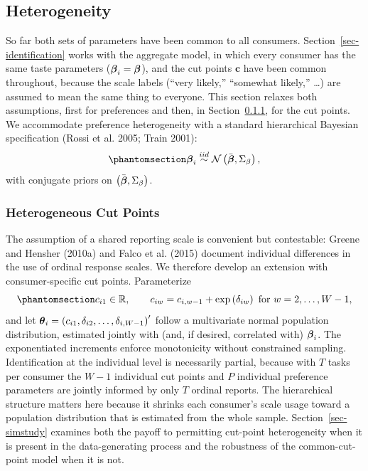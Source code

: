 \documentclass[
  letterpaper,
  DIV=11,
  numbers=noendperiod]{scrartcl}
\theoremstyle{plain}
\theoremstyle{plain}
\theoremstyle{plain}
\theoremstyle{remark}
\begin{document}
\subsection{Heterogeneity}\label{sec-heterogeneity}

So far both sets of parameters have been common to all consumers.
Section~\ref{sec-identification} works with the aggregate model, in
which every consumer has the same taste parameters
(\(\boldsymbol{\beta}_i = \boldsymbol{\beta}\)), and the cut points \(\mathbf{c}\) have been
common throughout, because the scale labels (``very likely,'' ``somewhat
likely,'' \ldots) are assumed to mean the same thing to everyone. This
section relaxes both assumptions, first for preferences and then, in
Section~\ref{sec-hetcut}, for the cut points. We accommodate preference
heterogeneity with a standard hierarchical Bayesian specification (Rossi
et al. 2005; Train 2001):
\begin{equation}\protect\phantomsection\label{eq-hb}{
\bfbeta_i \iid \mathcal{N} \left( \betabar, \Sigma_{\beta} \right),
}\end{equation} with conjugate priors on
\(\left( \bar{\boldsymbol{\beta}}, \Sigma_{\beta} \right)\).

\subsubsection{Heterogeneous Cut Points}\label{sec-hetcut}

The assumption of a shared reporting scale is convenient but
contestable: Greene and Hensher (2010a) and Falco et al. (2015) document
individual differences in the use of ordinal response scales. We
therefore develop an extension with consumer-specific cut points.
Parameterize
\begin{equation}\protect\phantomsection\label{eq-hetcutparam}{
c_{i1} \in \mathbb{R},
\qquad
c_{iw} = c_{i,w-1} + \exp \left( \delta_{iw} \right) \ \text{for} \ w = 2, \ldots, W-1,
}\end{equation} and let
\(\boldsymbol{\theta}_i = \left( c_{i1}, \delta_{i2}, \ldots, \delta_{i,W-1} \right)'\)
follow a multivariate normal population distribution, estimated jointly
with (and, if desired, correlated with) \(\boldsymbol{\beta}_i\). The exponentiated
increments enforce monotonicity without constrained sampling.
Identification at the individual level is necessarily partial, because
with \(T\) tasks per consumer the \(W-1\) individual cut points and
\(P\) individual preference parameters are jointly informed by only
\(T\) ordinal reports. The hierarchical structure matters here because
it shrinks each consumer's scale usage toward a population distribution
that is estimated from the whole sample. Section~\ref{sec-simstudy}
examines both the payoff to permitting cut-point heterogeneity when it
is present in the data-generating process and the robustness of the
common-cut-point model when it is not.
\end{document}
